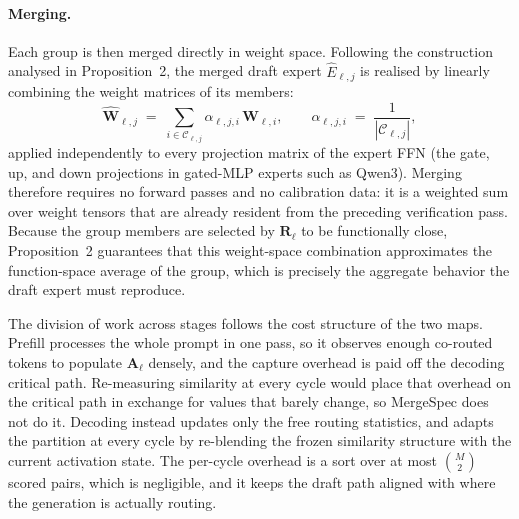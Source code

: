 \paragraph{Merging.}
Each group is then merged directly in weight space. Following the
construction analysed in Proposition~2, the merged draft expert
$\widehat{E}_{\ell,j}$ is realised by linearly combining the weight
matrices of its members:
\begin{equation}
\widehat{\mathbf{W}}_{\ell,j} \;=\;
  \sum_{i \in \mathcal{C}_{\ell,j}} \alpha_{\ell,j,i}\,\mathbf{W}_{\ell,i},
\qquad
\alpha_{\ell,j,i} \;=\; \frac{1}{|\mathcal{C}_{\ell,j}|},
\label{eq:weightmerge}
\end{equation}
applied independently to every projection matrix of the expert FFN (the
gate, up, and down projections in gated-MLP experts such as Qwen3).
Merging therefore requires no forward passes and no calibration data: it
is a weighted sum over weight tensors that are already resident from the
preceding verification pass. Because the group members are selected by
$\mathbf{R}_{\ell}$ to be functionally close, Proposition~2 guarantees
that this weight-space combination approximates the function-space
average of the group, which is precisely the aggregate behavior the draft
expert must reproduce.

The division of work across stages follows the cost structure of the
two maps.
Prefill processes the whole prompt in one pass, so it observes enough
co-routed tokens to populate $\mathbf{A}_{\ell}$ densely, and the capture
overhead is paid off the decoding critical path. Re-measuring similarity
at every cycle would place that overhead on the critical path in exchange
for values that barely change, so MergeSpec does not do it. Decoding
instead updates only the free routing statistics, and adapts the
partition at every cycle by re-blending the frozen similarity structure
with the current activation state. The per-cycle overhead is a sort over
at most $\binom{M}{2}$ scored pairs, which is negligible, and it keeps
the draft path aligned with where the generation is actually routing.
